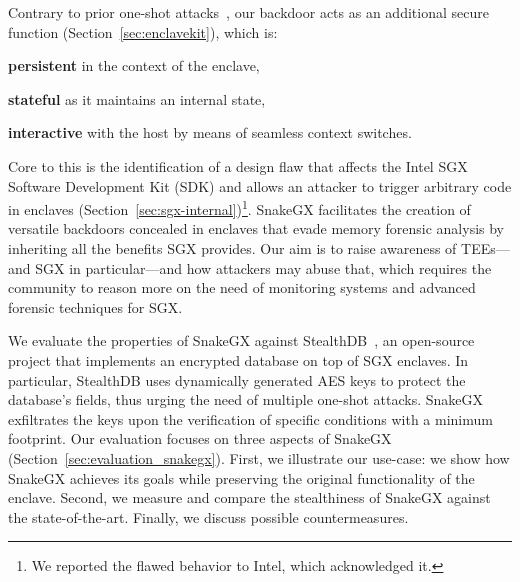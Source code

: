Contrary to prior one-shot attacks~\citep{biondo2018guard,lee2017hacking}, our 
backdoor acts as an additional secure function (Section~\ref{sec:enclavekit}), 
which is: 
\begin{enumerate*}[label=(\roman*)]
	\item \textbf{persistent} in the context of the enclave,
	\item \textbf{stateful} as it maintains an internal state,
	\item \textbf{interactive} with the host by means of seamless context 
	switches.
\end{enumerate*}
Core to this is the identification of a design flaw that
affects the Intel SGX Software Development Kit (SDK) and allows an attacker to 
trigger arbitrary code in enclaves 
(Section~\ref{sec:sgx-internal})\footnote{We reported the flawed 
	behavior to Intel, which acknowledged it.}.
SnakeGX facilitates the creation of versatile backdoors concealed in
enclaves that evade memory forensic analysis by inheriting all the benefits SGX 
provides.
Our aim is to raise awareness of TEEs---and SGX in particular---and how 
attackers may abuse that, which requires the community to reason more on the 
need of monitoring systems and advanced forensic techniques for SGX.

We evaluate the properties of SnakeGX against StealthDB~\citep{stealthdb}, an
open-source project that implements an encrypted database on top of SGX 
enclaves.
In particular, StealthDB uses dynamically generated AES keys to protect the
database's fields, thus urging the need of multiple one-shot attacks.
SnakeGX exfiltrates the keys upon the verification of specific conditions 
with a minimum footprint.
Our evaluation focuses on three aspects of SnakeGX 
(Section~\ref{sec:evaluation_snakegx}).
First, we illustrate our use-case: we show how SnakeGX achieves its goals
while preserving the original functionality of the enclave.
Second, we measure and compare the stealthiness of SnakeGX against the 
state-of-the-art.
Finally, we discuss possible countermeasures.


